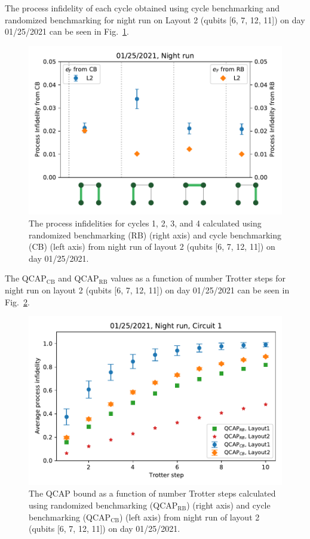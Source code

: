 The process infidelity of each cycle obtained using cycle benchmarking and randomized benchmarking for night run on Layout 2 (qubits [6, 7, 12, 11]) on day 01/25/2021 can be seen in Fig.~\ref{fig:processinfidelitiesStory5}.

\begin{figure}[H]
    \includegraphics[scale=0.5]{ProcessInfidelities_CB_RB_Data_01_25_2021Layout2aligned.pdf}
    \caption{The process infidelities for cycles  1, 2, 3, and 4 calculated using randomized benchmarking (RB) (right axis) and cycle benchmarking (CB) (left axis) from night run of layout 2 (qubits [6, 7, 12, 11]) on day 01/25/2021.}
    \label{fig:processinfidelitiesStory5}
\end{figure}

The QCAP$_{\text{CB}}$ and QCAP$_{\text{RB}}$ values as a function of number Trotter steps for night run on layout 2 (qubits [6, 7, 12, 11]) on day 01/25/2021 can be seen in Fig.~\ref{fig:QCAPCB_RB_Story5}.

\begin{figure}[H]
    \includegraphics[scale=0.56]{QCAP_CB_RB_Data_01_25_2021_Layout_1_2C1_Night.pdf}
    \caption{The QCAP bound as a function of number Trotter steps calculated using randomized benchmarking (QCAP$_{\text{RB}}$) (right axis) and cycle benchmarking (QCAP$_{\text{CB}}$) (left axis) from night run of layout 2 (qubits [6, 7, 12, 11]) on day 01/25/2021.}
    \label{fig:QCAPCB_RB_Story5}
\end{figure}

